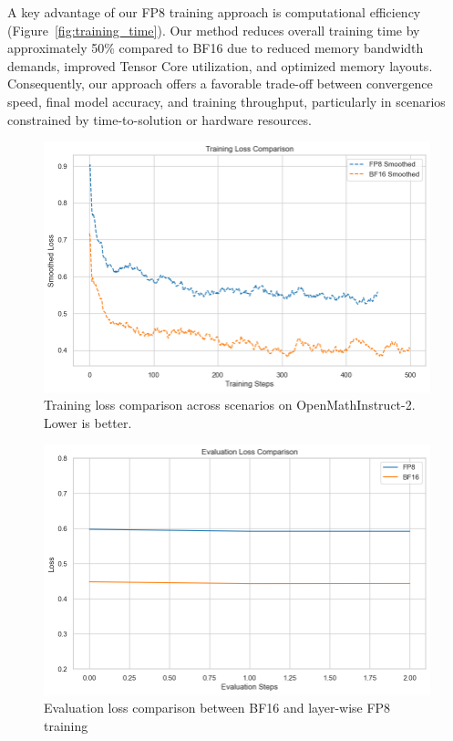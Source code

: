 \documentclass[conference]{IEEEtran}
\begin{document}
A key advantage of our FP8 training approach is computational efficiency (Figure~\ref{fig:training_time}). Our method reduces overall training time by approximately 50\% compared to BF16 due to reduced memory bandwidth demands, improved Tensor Core utilization, and optimized memory layouts. Consequently, our approach offers a favorable trade-off between convergence speed, final model accuracy, and training throughput, particularly in scenarios constrained by time-to-solution or hardware resources.

\begin{figure}[htbp]
    \centering
    \includegraphics[width=1\linewidth]{train_loss.png}
    \caption{Training loss comparison across scenarios on OpenMathInstruct-2. Lower is better.}
    \label{fig:train_loss}
\end{figure}

\begin{figure}[htbp]
    \centering
    \includegraphics[width=1\linewidth]{eval_loss.png}
    \caption{Evaluation loss comparison between BF16 and layer-wise FP8 training}
    \label{fig:eval_loss}
\end{figure}
\end{document}
